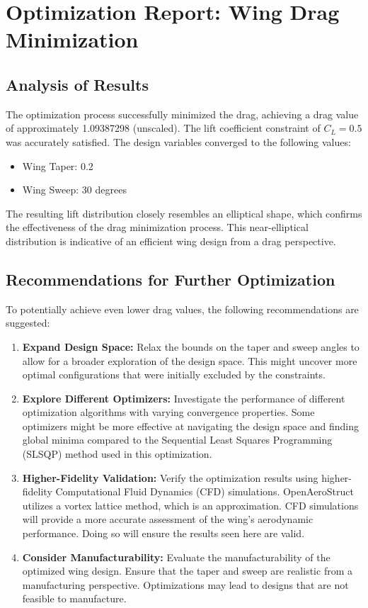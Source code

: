 \documentclass{article}
\begin{document}
\section*{Optimization Report: Wing Drag Minimization}

\subsection*{Analysis of Results}

The optimization process successfully minimized the drag, achieving a drag value of approximately 1.09387298 (unscaled). The lift coefficient constraint of $C_L = 0.5$ was accurately satisfied. The design variables converged to the following values:

\begin{itemize}
    \item Wing Taper: 0.2
    \item Wing Sweep: 30 degrees
\end{itemize}

The resulting lift distribution closely resembles an elliptical shape, which confirms the effectiveness of the drag minimization process. This near-elliptical distribution is indicative of an efficient wing design from a drag perspective.

\subsection*{Recommendations for Further Optimization}

To potentially achieve even lower drag values, the following recommendations are suggested:

\begin{enumerate}
    \item \textbf{Expand Design Space:} Relax the bounds on the taper and sweep angles to allow for a broader exploration of the design space. This might uncover more optimal configurations that were initially excluded by the constraints.
    \item \textbf{Explore Different Optimizers:} Investigate the performance of different optimization algorithms with varying convergence properties. Some optimizers might be more effective at navigating the design space and finding global minima compared to the Sequential Least Squares Programming (SLSQP) method used in this optimization.
    \item \textbf{Higher-Fidelity Validation:} Verify the optimization results using higher-fidelity Computational Fluid Dynamics (CFD) simulations. OpenAeroStruct utilizes a vortex lattice method, which is an approximation. CFD simulations will provide a more accurate assessment of the wing's aerodynamic performance. Doing so will ensure the results seen here are valid.
    \item \textbf{Consider Manufacturability:} Evaluate the manufacturability of the optimized wing design. Ensure that the taper and sweep are realistic from a manufacturing perspective. Optimizations may lead to designs that are not feasible to manufacture.
\end{enumerate}
\end{document}

